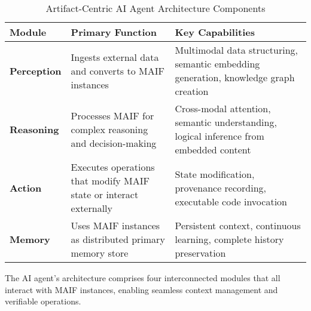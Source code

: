 \documentclass[conference]{IEEEtran}
\begin{document}
\begin{table*}[!t]
\renewcommand{\arraystretch}{1.3}
\caption{Artifact-Centric AI Agent Architecture Components}
\label{tab:agent-components}
\centering
\footnotesize
\begin{tabular}{p{3cm}p{5.5cm}p{5.5cm}}
\toprule
\textbf{Module} & \textbf{Primary Function} & \textbf{Key Capabilities} \\
\midrule
\textbf{Perception} & Ingests external data and converts to MAIF instances & Multimodal data structuring, semantic embedding generation, knowledge graph creation \\
\textbf{Reasoning} & Processes MAIF for complex reasoning and decision-making & Cross-modal attention, semantic understanding, logical inference from embedded content \\
\textbf{Action} & Executes operations that modify MAIF state or interact externally & State modification, provenance recording, executable code invocation \\
\textbf{Memory} & Uses MAIF instances as distributed primary memory store & Persistent context, continuous learning, complete history preservation \\
\bottomrule
\end{tabular}
\end{table*}

The AI agent's architecture comprises four interconnected modules that all interact with MAIF instances, enabling seamless context management and verifiable operations.
\end{document}
